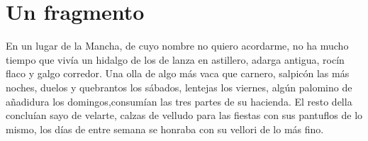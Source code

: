 \documentclass{book}
\begin{document}
\section{Un fragmento}
\begin{multicols}{3}
En un lugar de la Mancha, de cuyo nombre no quiero acordarme, no ha mucho tiempo que vivía un hidalgo de los de lanza en astillero, adarga antigua, rocín flaco y galgo corredor. Una olla de algo más vaca que carnero, salpicón las más noches, duelos y quebrantos los sábados, lentejas los viernes, algún palomino de añadidura los domingos,consumían las tres partes de su hacienda. El resto della concluían sayo de velarte, calzas de velludo para las fiestas con sus pantuflos de lo mismo, los días de entre semana se honraba con su vellori de lo más fino. 
\end{multicols}
\end{document}
